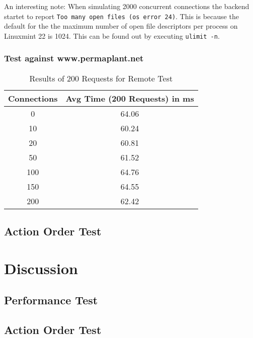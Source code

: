 \documentclass[final,draft,oneside]{vutinfth}
\begin{document}
An interesting note: When simulating 2000 concurrent connections the backend startet to report \texttt{Too many open files (os error 24)}.
This is because the default for the the maximum number of open file descriptors per process on Linuxmint 22 is 1024.
This can be found out by executing \texttt{ulimit -n}.


\subsection{Test against www.permaplant.net}

\begin{table}[h!]
    \centering
    \begin{tabular}{cc}
        \toprule
        \textbf{Connections} & \textbf{Avg Time (200 Requests) in ms} \\
        \midrule
        0 & 64.06 \\
        10 & 60.24 \\
        20 & 60.81 \\
        50 & 61.52 \\
        100 & 64.76 \\
        150 & 64.55 \\
        200 & 62.42 \\
        \bottomrule
    \end{tabular}
    \caption{Results of 200 Requests for Remote Test}
\end{table}

\section{Action Order Test}

\chapter{Discussion}

\section{Performance Test}

\section{Action Order Test}

\printglossary[type=\acronymtype,title=Acronyms]

\backmatter



\end{document}
